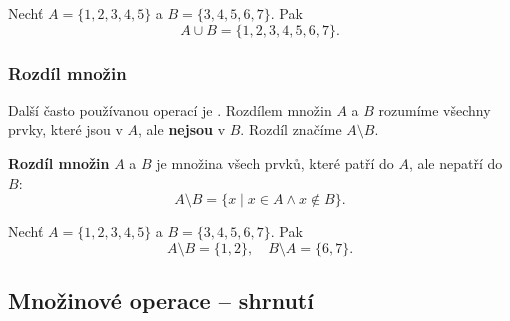 \documentclass[12pt,a4paper]{article}
\begin{document}
\begin{examplebox}
Nechť $A = \{1,2,3,4,5\}$ a $B = \{3,4,5,6,7\}$.  
Pak
\[
A \cup B = \{1,2,3,4,5,6,7\}.
\]
\end{examplebox}


\subsubsection*{Rozdíl množin}

Další často používanou operací je .  
Rozdílem množin $A$ a $B$ rozumíme všechny prvky, které jsou v $A$, ale \textbf{nejsou} v $B$.  
Rozdíl značíme $A \setminus B$.  

\begin{definitionbox}
\textbf{Rozdíl množin} $A$ a $B$ je množina všech prvků, které patří do $A$, ale nepatří do $B$:  
\[
A \setminus B = \{x \mid x \in A \land x \notin B\}.
\]
\end{definitionbox}

\begin{examplebox}
Nechť $A = \{1,2,3,4,5\}$ a $B = \{3,4,5,6,7\}$.  
Pak
\[
A \setminus B = \{1,2\}, \quad B \setminus A = \{6,7\}.
\]
\end{examplebox}

\newpage
\subsection{Množinové operace – shrnutí}
\end{document}
